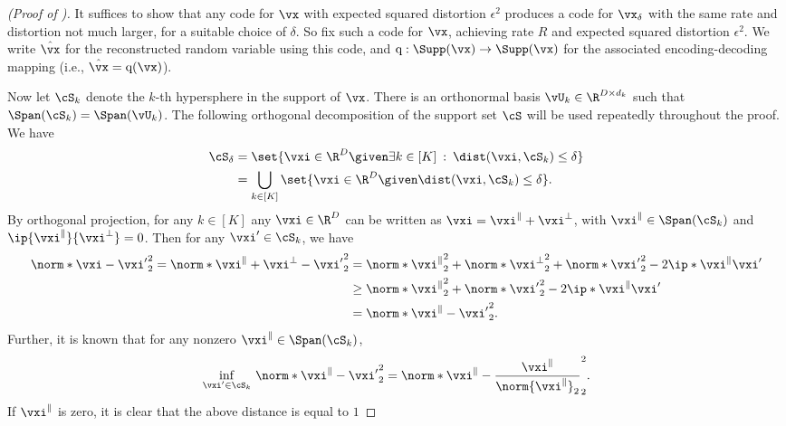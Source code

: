 \documentclass[../../book-main.tex]{subfiles}
\begin{document}
\begin{proof}[(Proof of )]
    It suffices to show that any code for $\vx$ with expected squared distortion
    $\epsilon^2$ produces a code for $\vx_{\delta}$ with the same rate and
    distortion not much larger, for a suitable choice of $\delta$.
    So fix such a code for $\vx$, achieving rate $R$ and expected squared
    distortion $\epsilon^2$. We write $\hat{\vx}$ for the reconstructed random
    variable using this code, and $\mathrm{q} : \Supp(\vx) \to \Supp(\vx)$
    for the associated encoding-decoding mapping (i.e., $\hat{\vx}
    = \mathrm{q}(\vx)$).

    Now let $\cS_k$ denote the $k$-th hypersphere in the support of $\vx$.
    There is an orthonormal basis $\vU_{k} \in \R^{D \times d_k}$ such that
    $\Span(\cS_k) = \Span(\vU_k)$.
    The following orthogonal decomposition of the support set $\cS$
    will be used repeatedly throughout the proof.
    We have
    \begin{align}
        \cS_{\delta}
        &= \set{\vxi \in \R^D \given \exists k \in [K] \::\: \dist(\vxi,
        \cS_k) \leq \delta}
        \\
        &= \bigcup_{k \in [K]} \set{\vxi \in \R^D \given \dist(\vxi,
        \cS_k) \leq \delta}.
    \end{align}
    By orthogonal projection, for any $k \in [K]$ any $\vxi \in \R^D$ can be
    written as $\vxi = \vxi^{\|} + \vxi^{\perp}$, with $\vxi^{\|} \in
    \Span(\cS_k)$
    and $\ip{\vxi^{\|}}{\vxi^\perp} = 0$.
    Then for any $\vxi' \in \cS_k$, we have
    \begin{align}
        \norm*{\vxi - \vxi'}_2^2
        =
        \norm*{\vxi^{\|} + \vxi^{\perp} - \vxi'}_2^2
        &=
        \norm*{\vxi^{\|}}_2^2 + \norm*{\vxi^{\perp}}_2^2 + \norm*{\vxi'}_2^2
        - 2 \ip*{\vxi^{\|}}{\vxi'}
        \\
        &\geq
        \norm*{\vxi^{\|}}_2^2 + \norm*{\vxi'}_2^2
        - 2 \ip*{\vxi^{\|}}{\vxi'}
        \\
        &=
        \norm*{\vxi^{\|} - \vxi'}_2^2.
    \end{align}
    Further, it is known that for any nonzero $\vxi^{\|} \in \Span(\cS_k)$,
    \begin{equation}
        \inf_{\vxi' \in \cS_k}\,
        \norm*{\vxi^{\|} - \vxi'}_2^2
        =
        \norm*{\vxi^{\|} - \frac{\vxi^{\|}}{\norm{\vxi^{\|}}_2}}_2^2.
    \end{equation}
    If $\vxi^{\|}$ is zero, it is clear that the above distance is equal to $1$

\end{proof}
\end{document}
